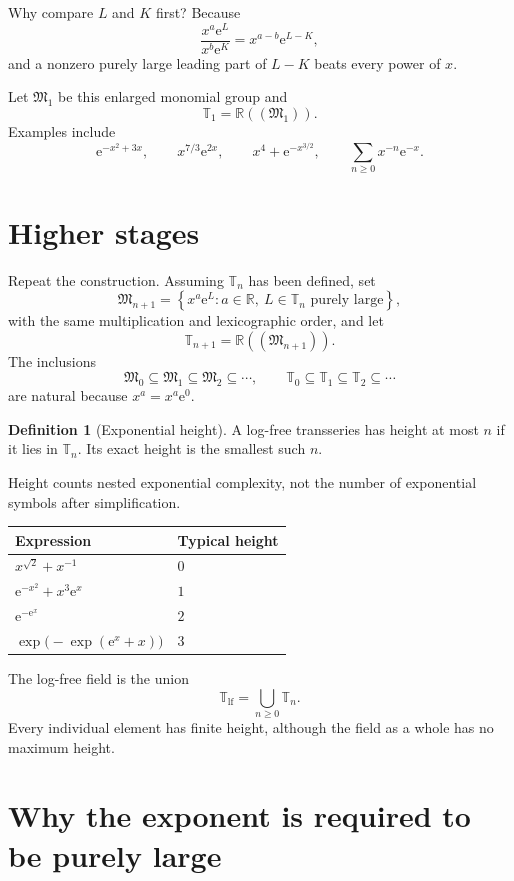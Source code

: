 \documentclass[11pt,oneside]{book}
\theoremstyle{definition}
\newtheorem{definition}[theorem]{Definition}
\theoremstyle{remark}
\newcommand{\R}{\mathbb{R}}
\newcommand{\T}{\mathbb{T}}
\newcommand{\M}{\mathfrak{M}}
\newcommand{\e}{\mathrm{e}}
\begin{document}
Why compare $L$ and $K$ first? Because
\[
  \frac{x^a\e^L}{x^b\e^K}=x^{a-b}\e^{L-K},
\]
and a nonzero purely large leading part of $L-K$ beats every power of $x$.

Let $\M_1$ be this enlarged monomial group and
\[
  \T_1=\R((\M_1)).
\]
Examples include
\[
  \e^{-x^2+3x},\qquad x^{7/3}\e^{2x},\qquad
  x^4+\e^{-x^{3/2}},\qquad
  \sum_{n\ge0}x^{-n}\e^{-x}.
\]

\section{Higher stages}

Repeat the construction. Assuming $\T_n$ has been defined, set
\begin{equation}
  \M_{n+1}
  =\left\{x^a\e^L:
      a\in\R,\ L\in\T_n\text{ purely large}
    \right\},
  \label{eq:monomial-height-recursion}
\end{equation}
with the same multiplication and lexicographic order, and let
\[
  \T_{n+1}=\R((\M_{n+1})).
\]
The inclusions
\[
  \M_0\subseteq\M_1\subseteq\M_2\subseteq\cdots,
  \qquad
  \T_0\subseteq\T_1\subseteq\T_2\subseteq\cdots
\]
are natural because $x^a=x^a\e^0$.

\begin{definition}[Exponential height]
A log-free transseries has height at most $n$ if it lies in $\T_n$. Its exact
height is the smallest such $n$.
\end{definition}

Height counts nested exponential complexity, not the number of exponential
symbols after simplification.

\begin{center}
\begin{tabular}{@{}ll@{}}
\toprule
Expression & Typical height\\
\midrule
$x^{\sqrt2}+x^{-1}$ & $0$\\
$\e^{-x^2}+x^3\e^x$ & $1$\\
$\e^{-\e^x}$ & $2$\\
$\exp\!\bigl(-\exp(\e^x+x)\bigr)$ & $3$\\
\bottomrule
\end{tabular}
\end{center}

The log-free field is the union
\[
  \T_{\mathrm{lf}}=\bigcup_{n\ge0}\T_n.
\]
Every individual element has finite height, although the field as a whole has no
maximum height.

\section{Why the exponent is required to be purely large}
\end{document}
